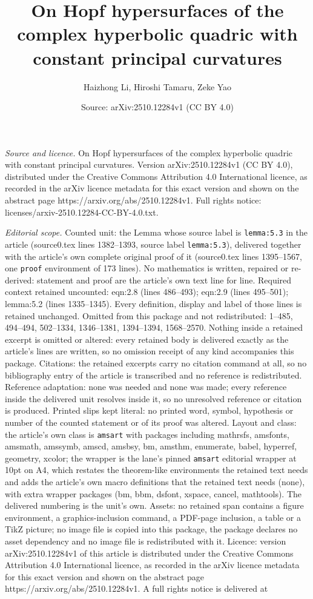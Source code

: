 \documentclass[10pt,a4paper]{amsart}
\title[On Hopf hypersurfaces of the complex hyperbolic quadric with]{On Hopf hypersurfaces of the complex hyperbolic quadric with constant principal curvatures}
\author{Haizhong Li, Hiroshi Tamaru, Zeke Yao}
\date{Source: arXiv:2510.12284v1 (CC BY 4.0)}
\begin{document}
\maketitle

\noindent\emph{Source and licence.} On Hopf hypersurfaces of the complex hyperbolic quadric with constant principal curvatures. Version arXiv:2510.12284v1 (CC BY 4.0), distributed under the Creative Commons Attribution 4.0 International licence, as recorded in the arXiv licence metadata for this exact version and shown on the abstract page https://arxiv.org/abs/2510.12284v1. Full rights notice: licenses/arxiv-2510.12284-CC-BY-4.0.txt.\par\smallskip

\noindent\textit{Editorial scope.} Counted unit: the Lemma whose source label is \texttt{lemma:5.3} in the article (source0.tex lines 1382--1393, source label \texttt{lemma:5.3}), delivered together with the article's own complete original proof of it (source0.tex lines 1395--1567, one \texttt{proof} environment of 173 lines). No mathematics is written, repaired or re-derived: statement and proof are the article's own text line for line. Required context retained uncounted: eqn:2.8 (lines 486--493); eqn:2.9 (lines 495--501); lemma:5.2 (lines 1335--1345). Every definition, display and label of those lines is retained unchanged. Omitted from this package and not redistributed: 1--485, 494--494, 502--1334, 1346--1381, 1394--1394, 1568--2570. Nothing inside a retained excerpt is omitted or altered: every retained body is delivered exactly as the article's lines are written, so no omission receipt of any kind accompanies this package. Citations: the retained excerpts carry no citation command at all, so no bibliography entry of the article is transcribed and no reference is redistributed. Reference adaptation: none was needed and none was made; every reference inside the delivered unit resolves inside it, so no unresolved reference or citation is produced. Printed slips kept literal: no printed word, symbol, hypothesis or number of the counted statement or of its proof was altered. Layout and class: the article's own class is \texttt{amsart} with packages including mathrsfs, amsfonts, amsmath, amssymb, amscd, amsbsy, bm, amsthm, enumerate, babel, hyperref, geometry, xcolor; the wrapper is the lane's pinned \texttt{amsart} editorial wrapper at 10pt on A4, which restates the theorem-like environments the retained text needs and adds the article's own macro definitions that the retained text needs (none), with extra wrapper packages (bm, bbm, dsfont, xspace, cancel, mathtools). The delivered numbering is the unit's own. Assets: no retained span contains a figure environment, a graphics-inclusion command, a PDF-page inclusion, a table or a TikZ picture; no image file is copied into this package, the package declares no asset dependency and no image file is redistributed with it. Licence: version arXiv:2510.12284v1 of this article is distributed under the Creative Commons Attribution 4.0 International licence, as recorded in the arXiv licence metadata for this exact version and shown on the abstract page https://arxiv.org/abs/2510.12284v1. A full rights notice is delivered at 
\end{document}
